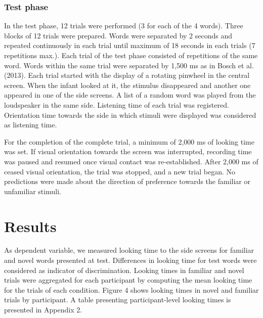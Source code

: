 \documentclass[man,floatsintext]{apa6}
\begin{document}
\hypertarget{test-phase}{%
\subsubsection{Test phase}\label{test-phase}}

In the test phase, 12 trials were performed (3 for each of the 4 words). Three blocks of 12 trials were prepared. Words were separated by 2 seconds and repeated continuously in each trial until maximum of 18 seconds in each trials (7 repetitions max.). Each trial of the test phase consisted of repetitions of the same word. Words within the same trial were separated by 1,500 ms as in Bosch et al. (2013). Each trial started with the display of a rotating pinwheel in the central screen. When the infant looked at it, the stimulus disappeared and another one appeared in one of the side screens. A list of a random word was played from the loudspeaker in the same side. Listening time of each trial was registered. Orientation time towards the side in which stimuli were displayed was considered as listening time.

For the completion of the complete trial, a minimum of 2,000 ms of looking time was set. If visual orientation towards the screen was interrupted, recording time was paused and resumed once visual contact was re-established. After 2,000 ms of ceased visual orientation, the trial was stopped, and a new trial began. No predictions were made about the direction of preference towards the familiar or unfamiliar stimuli.

\hypertarget{results}{%
\section{Results}\label{results}}

As dependent variable, we measured looking time to the side screens for familiar and novel words presented at test. Differences in looking time for test words were considered as indicator of discrimination. Looking times in familiar and novel trials were aggregated for each participant by computing the mean looking time for the trials of each condition. Figure 4 shows looking times in novel and familiar trials by participant. A table presenting participant-level looking times is presented in Appendix 2.
\end{document}
